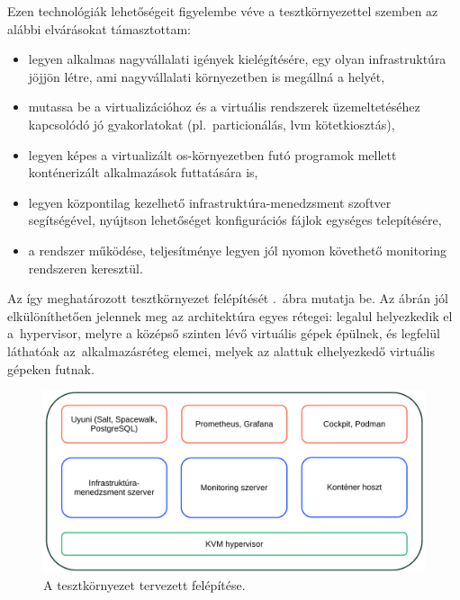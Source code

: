 Ezen technológiák lehetőségeit figyelembe véve a tesztkörnyezettel szemben az alábbi elvárásokat támasztottam:
\begin{itemize}
	\item legyen alkalmas nagyvállalati igények kielégítésére, egy olyan infrastruktúra jöjjön létre, ami nagyvállalati környezetben is megállná a helyét,
	\item mutassa be a virtualizációhoz és a virtuális rendszerek üzemeltetéséhez kapcsolódó jó gyakorlatokat (pl.~particionálás, \acrshort{lvm} kötetkiosztás),
	\item legyen képes a virtualizált \acrshort{os}-környezetben futó programok mellett konténerizált alkalmazások futtatására is,
	\item legyen központilag kezelhető infrastruktúra-menedzsment szoftver segítségével, nyújtson lehetőséget konfigurációs fájlok egységes telepítésére,
	\item a rendszer működése, teljesítménye legyen jól nyomon követhető monitoring rendszeren keresztül.
\end{itemize}

Az így meghatározott tesztkörnyezet felépítését .~ábra mutatja be. Az ábrán jól elkülöníthetően jelennek meg az architektúra egyes rétegei: legalul helyezkedik el a~\gls{hypervisor}, melyre a középső szinten lévő virtuális gépek épülnek, és legfelül láthatóak az~alkalmazásréteg elemei, melyek az alattuk elhelyezkedő virtuális gépeken futnak.

\begin{figure}[!ht]
	\centering
	\includegraphics[width=15cm]{figures/architektura.pdf}
	\caption{A tesztkörnyezet tervezett felépítése.}
	\label{fig:test-env-arch}
\end{figure}

